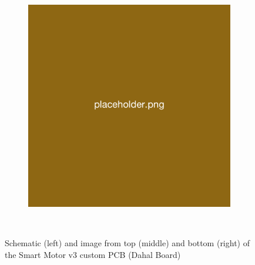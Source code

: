 \begin{figure}[H]
\begin{subfigure}[b]{0.25\textwidth}
    \end{subfigure}
    \hspace{10pt}
    \begin{subfigure}[b]{0.25\textwidth}
        \includegraphics[width=\linewidth]{overleaf/images/placeholder.png}
    \end{subfigure}
    \\\vspace{\ftspace}
    \caption{Schematic (left) and image  from top (middle) and bottom (right) of the Smart Motor v3 custom PCB (Dahal Board)}
    \label{fig:sm_dahal_board}
\end{figure}

